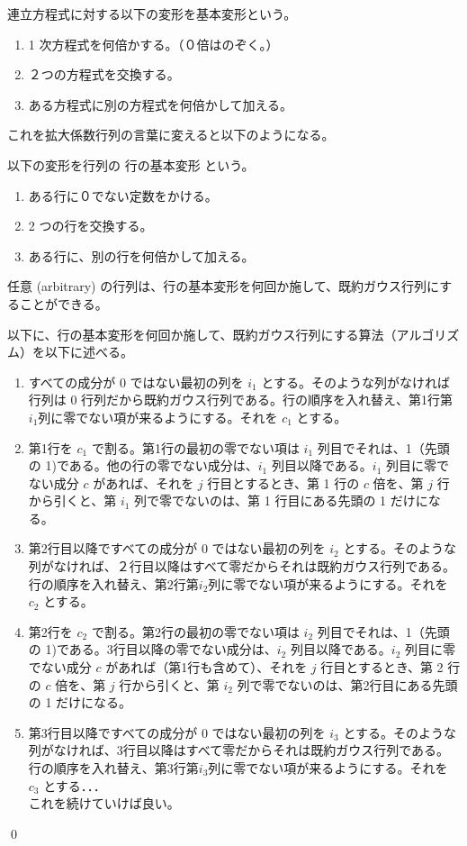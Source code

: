 連立方程式に対する以下の変形を基本変形という。
\begin{enumerate}
\item 1 次方程式を何倍かする。（０倍はのぞく。）
\item ２つの方程式を交換する。
\item ある方程式に別の方程式を何倍かして加える。
\end{enumerate}

これを拡大係数行列の言葉に変えると以下のようになる。
\begin{definition}
以下の変形を行列の {\gt 行の基本変形} という。
\begin{enumerate}
\item ある行に０でない定数をかける。
\item 2 つの行を交換する。
\item ある行に、別の行を何倍かして加える。
\end{enumerate}
\end{definition}

\begin{thm}
任意 {\rm (arbitrary)} の行列は、行の基本変形を何回か施して、既約ガウス行列にすることができる。
\end{thm}
\proof
以下に、行の基本変形を何回か施して、既約ガウス行列にする算法（アルゴリズム）を以下に述べる。
\begin{enumerate}
\item すべての成分が 0 ではない最初の列を $i_1$ とする。そのような列がなければ行列は 0 行列だから既約ガウス行列である。行の順序を入れ替え、第1行第$i_1$列に零でない項が来るようにする。それを $c_1$ とする。
\item 第1行を $c_1$ で割る。第1行の最初の零でない項は $i_1$ 列目でそれは、1（先頭の 1)である。他の行の零でない成分は、$i_1$ 列目以降である。$i_1$ 列目に零でない成分 $c$ があれば、それを $j$ 行目とするとき、第 1 行の $c$ 倍を、第 $j$ 行から引くと、第 $i_1$ 列で零でないのは、第 1 行目にある先頭の 1 だけになる。
\item 第2行目以降ですべての成分が 0 ではない最初の列を $i_2$ とする。そのような列がなければ、２行目以降はすべて零だからそれは既約ガウス行列である。行の順序を入れ替え、第2行第$i_2$列に零でない項が来るようにする。それを $c_2$ とする。
\item 第2行を $c_2$ で割る。第2行の最初の零でない項は $i_2$ 列目でそれは、1（先頭の 1)である。3行目以降の零でない成分は、$i_2$ 列目以降である。$i_2$ 列目に零でない成分 $c$ があれば（第1行も含めて）、それを $j$ 行目とするとき、第 2 行の $c$ 倍を、第 $j$ 行から引くと、第 $i_2$ 列で零でないのは、第2行目にある先頭の 1 だけになる。
\item 第3行目以降ですべての成分が 0 ではない最初の列を $i_3$ とする。そのような列がなければ、3行目以降はすべて零だからそれは既約ガウス行列である。行の順序を入れ替え、第3行第$i_3$列に零でない項が来るようにする。それを $c_3$ とする．．．\\
これを続けていけば良い。
\end{enumerate}
\qed


